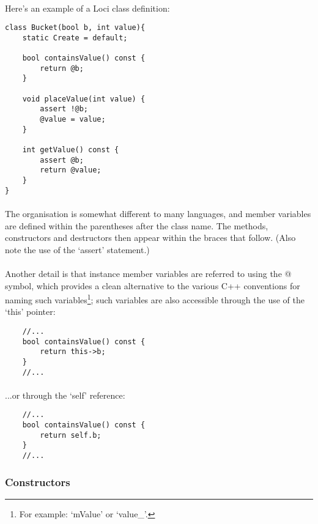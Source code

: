 \documentclass[12pt,twoside,notitlepage]{report}
\begin{document}
\paragraph{}
Here's an example of a Loci class definition:

\begin{lstlisting}
class Bucket(bool b, int value){
	static Create = default;
	
	bool containsValue() const {
		return @b;
	}
	
	void placeValue(int value) {
		assert !@b;
		@value = value;
	}
	
	int getValue() const {
		assert @b;
		return @value;
	}
}
\end{lstlisting}


\paragraph{}
The organisation is somewhat different to many languages, and member variables are defined within the parentheses after the class name. The methods, constructors and destructors then appear within the braces that follow. (Also note the use of the `assert' statement.)

\paragraph{}
Another detail is that instance member variables are referred to using the @ symbol, which provides a clean alternative to the various C++ conventions for naming such variables\footnote{For example: `mValue' or `value\_'.}; such variables are also accessible through the use of the `this' pointer:


\begin{lstlisting}
	//...
	bool containsValue() const {
		return this->b;
	}
	//...
\end{lstlisting}


\paragraph{}
...or through the `self' reference:


\begin{lstlisting}
	//...
	bool containsValue() const {
		return self.b;
	}
	//...
\end{lstlisting}


\subsubsection{Constructors}
\end{document}
